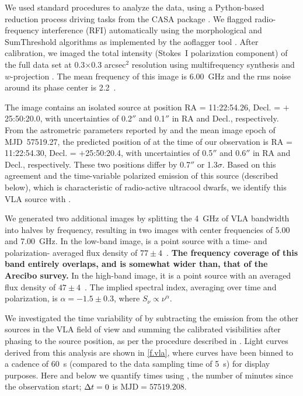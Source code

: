 \documentclass[twocolumn, times]{aastex6}
\begin{document}
We used standard procedures to analyze the data, using a Python-based
reduction process driving tasks from the CASA package \citep{the.casa}. We
flagged radio-frequency interference (RFI) automatically using the
morphological and \textsf{SumThreshold} algorithms as implemented by the
\textsf{aoflagger} tool \citep{odbb+10, ovdgr12}. After calibration, we imaged
the total intensity (Stokes~I polarization component) of the full data set at
0.3$\times$0.3 arcsec$^2$ resolution using multifrequency synthesis
\citep{the.mfs} and $w$-projection \citep{cgb05}. The mean frequency of this
image is 6.00~GHz and the rms noise around its phase center is 2.2~\ujybm.

The image contains an isolated source at position RA = 11:22:54.26, Decl. =
$+$25:50:20.0, with uncertainties of 0.2$''$ and 0.1$''$ in RA and Decl.,
respectively. From the astrometric parameters reported by \citet{kcg+11} and
the mean image epoch of MJD~57519.27, the predicted position of 
at the time of our observation is RA = 11:22:54.30, Decl. = $+$25:50:20.4,
with uncertainties of 0.5$''$ and 0.6$''$ in RA and Decl., respectively. These
two positions differ by 0.7$''$ or 1.3$\sigma$. Based on this agreement and
the time-variable polarized emission of this source (described below), which
is characteristic of radio-active ultracool dwarfs, we identify this VLA
source with .

We generated two additional images by splitting the 4~GHz of VLA bandwidth
into halves by frequency, resulting in two images with center frequencies of
5.00 and 7.00~GHz. In the low-band image,  is a point source with
a time- and polarization- averaged flux density of $77 \pm 4$~\ujy.
\textbf{The frequency coverage of this band entirely overlaps, and is somewhat
  wider than, that of the Arecibo survey.} In the high-band image, it is a
point source with an averaged flux density of $47 \pm 4$~\ujy. The implied
spectral index, averaging over time and polarization, is $\alpha = -1.5 \pm
0.3$, where $S_\nu \propto \nu^\alpha$.

We investigated the time variability of  by subtracting the
emission from the other sources in the VLA field of view and summing the
calibrated visibilities after phasing to the source position, as per the
procedure described in \citet{wbz13}. Light curves derived from this analysis
are shown in \autoref{f.vla}, where curves have been binned to a cadence of
60~s (compared to the data sampling time of 5~s) for display purposes. Here
and below we quantify times using \dt, the number of minutes since the
observation start; ${\Delta t} = 0$ is $\text{MJD} = 57519.208$.
\end{document}
